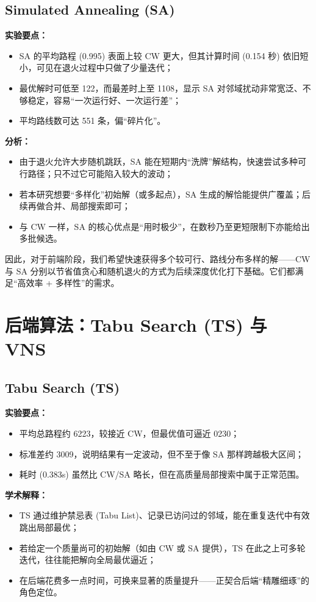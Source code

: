 \documentclass[12pt,a4paper,twoside]{ctexbook}
\begin{document}
\subsection{Simulated Annealing (SA)}
\textbf{实验要点：}
\begin{itemize}
    \item SA 的平均路程 (0.995) 表面上较 CW 更大，但其计算时间 (0.154 秒) 依旧短小，可见在退火过程中只做了少量迭代；
    \item 最优解时可低至 122，而最差时上至 1108，显示 SA 对邻域扰动非常宽泛、不够稳定，容易“一次运行好、一次运行差”；
    \item 平均路线数可达 551 条，偏“碎片化”。
\end{itemize}

\textbf{分析：}
\begin{itemize}
    \item 由于退火允许大步随机跳跃，SA 能在短期内“洗牌”解结构，快速尝试多种可行路径；只不过它可能陷入较大的波动；
    \item 若本研究想要“多样化”初始解（或多起点），SA 生成的解恰能提供广覆盖；后续再做合并、局部搜索即可；
    \item 与 CW 一样，SA 的核心优点是“用时极少”，在数秒乃至更短限制下亦能给出多批候选。
\end{itemize}

因此，对于前端阶段，我们希望快速获得多个较可行、路线分布多样的解——CW 与 SA 分别以节省值贪心和随机退火的方式为后续深度优化打下基础。它们都满足“高效率 + 多样性”的需求。

\section{后端算法：Tabu Search (TS) 与 VNS}

\subsection{Tabu Search (TS)}
\textbf{实验要点：}
\begin{itemize}
    \item 平均总路程约 6223，较接近 CW，但最优值可逼近 0230；
    \item 标准差约 3009，说明结果有一定波动，但不至于像 SA 那样跨越极大区间；
    \item 耗时 (0.383s) 虽然比 CW/SA 略长，但在高质量局部搜索中属于正常范围。
\end{itemize}

\textbf{学术解释：}
\begin{itemize}
    \item TS 通过维护禁忌表 (Tabu List)、记录已访问过的邻域，能在重复迭代中有效跳出局部最优；
    \item 若给定一个质量尚可的初始解（如由 CW 或 SA 提供），TS 在此之上可多轮迭代，往往能把解向全局最优逼近；
    \item 在后端花费多一点时间，可换来显著的质量提升——正契合后端“精雕细琢”的角色定位。
\end{itemize}
\end{document}

